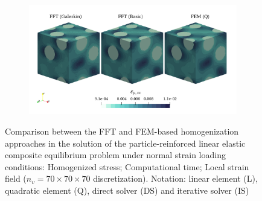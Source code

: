 \begin{figure}[hbt]
\begin{subfigure}[b]{0.49\textwidth}
    \caption{}
    \label{subfig:linear_3D_normal_cpu_time_vs_n_voxels}
  \end{subfigure}
  \begin{subfigure}[b]{\textwidth}
    \centering
    \includegraphics[width=\textwidth]{figures/linear_3D_normal_strain_11}
    \caption{}
    \label{subfig:linear_3D_normal_strain_11}
  \end{subfigure}
  \caption{Comparison between the FFT and FEM-based homogenization approaches in the
  solution of the particle-reinforced linear elastic composite equilibrium problem under normal
  strain loading conditions:  Homogenized stress;  Computational time;  Local strain field
  (\(n_v = 70 \times 70\times 70\) discretization). Notation: linear element (L), quadratic element (Q), direct solver
  (DS) and iterative solver (IS)}
  \label{fig:linear_3D_normal}
\end{figure}

